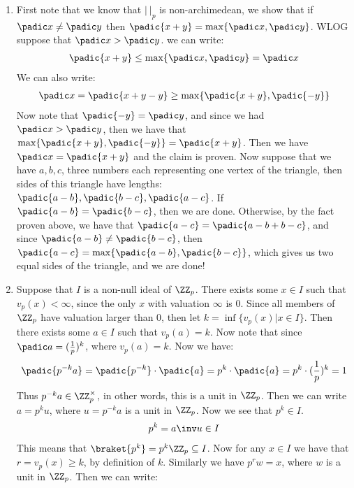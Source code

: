 \begin{enumerate}[label=\ilabel]
    \item 
        First note that we know that $|\ |_p$ is non-archimedean, we show that if $\padic x \ne \padic y$ then $\padic{x + y} = \max \{ \padic x , \padic y \}$.
        WLOG suppose that $\padic x > \padic y$. we can write:
        \begin{gather*}
            \padic{x + y} \le \max \{\padic x, \padic y \} = \padic x 
        \end{gather*}
        We can also write:
        \begin{gather*}
            \padic x = \padic{x + y - y} \ge \max \{ \padic{x + y}, \padic{-y} \}
        \end{gather*}
        Now note that $\padic{-y} = \padic y$, and since we had $\padic x > \padic y$, then we have that $\max \{ \padic{x + y} , \padic{-y} \} = \padic{x + y}$. Then we have $\padic x = \padic{x + y}$ and the claim is proven.
        Now suppose that we have $a, b, c$, three numbers each representing one vertex of the triangle, then sides of this triangle have lengths: $\padic{a - b}, \padic{b - c}, \padic{a - c}$. If $\padic{a - b} = \padic{b - c}$, then we are done. Otherwise, by the fact proven above, we have that $\padic{a - c} = \padic{a - b + b - c}$, and since $\padic{a - b} \ne \padic{b - c}$, then $\padic{a - c} = \max \{\padic{a - b}, \padic{b - c} \}$, which gives us two equal sides of the triangle, and we are done!
    \item
        Suppose that $I$ is a non-null ideal of $\ZZ_p$. There exists some $x \in I$ such that $v_p(x) < \infty$, since the only $x$ with valuation $\infty$ is $0$. Since all members of $\ZZ_p$ have valuation larger than 0, then let $k = \inf \{ v_p(x) | x \in I \}$. Then there exists some $a \in I$ such that $v_p(a) = k$. Now note that since $ \padic a = (\frac{1}{p})^k$, where $v_p(a) = k$. Now we have:
        \begin{gather*}
            \padic{p^{-k} a} = \padic{p^{-k}} \cdot \padic{a} = p^k \cdot \padic{a} = p^k \cdot (\frac{1}{p})^k = 1 
        \end{gather*}
        Thus $p^{-k}a \in \ZZ_p^\times$, in other words, this is a unit in $\ZZ_p$. Then we can write $a = p^k u$, where $u = p^{-k}a$ is a unit in $\ZZ_p$. Now we see that $p^k \in I$.
        \begin{gather*}
            p^k = a \inv u \in I
        \end{gather*}
        This means that $\braket{p^k} = p^k \ZZ_p \subseteq I$. Now for any $x \in I$ we have that $r = v_p(x) \ge k$, by definition of $k$. Similarly we have $p^r w = x$, where $w$ is a unit in $\ZZ_p$. Then we can write:

\end{enumerate}
